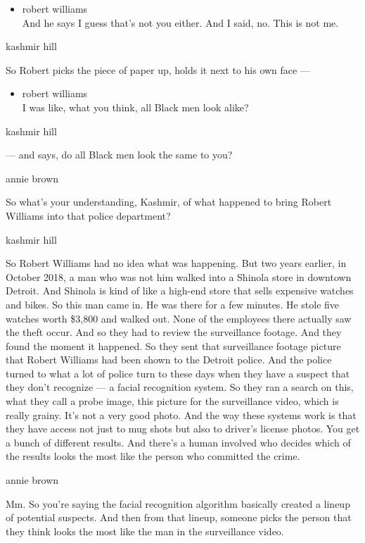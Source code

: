 \begin{itemize}
\tightlist
\item
  robert williams\\
  And he says I guess that's not you either. And I said, no. This is not
  me.
\end{itemize}

kashmir hill

So Robert picks the piece of paper up, holds it next to his own face ---

\begin{itemize}
\tightlist
\item
  robert williams\\
  I was like, what you think, all Black men look alike?
\end{itemize}

kashmir hill

--- and says, do all Black men look the same to you?

annie brown

So what's your understanding, Kashmir, of what happened to bring Robert
Williams into that police department?

kashmir hill

So Robert Williams had no idea what was happening. But two years
earlier, in October 2018, a man who was not him walked into a Shinola
store in downtown Detroit. And Shinola is kind of like a high-end store
that sells expensive watches and bikes. So this man came in. He was
there for a few minutes. He stole five watches worth \$3,800 and walked
out. None of the employees there actually saw the theft occur. And so
they had to review the surveillance footage. And they found the moment
it happened. So they sent that surveillance footage picture that Robert
Williams had been shown to the Detroit police. And the police turned to
what a lot of police turn to these days when they have a suspect that
they don't recognize --- a facial recognition system. So they ran a
search on this, what they call a probe image, this picture for the
surveillance video, which is really grainy. It's not a very good photo.
And the way these systems work is that they have access not just to mug
shots but also to driver's license photos. You get a bunch of different
results. And there's a human involved who decides which of the results
looks the most like the person who committed the crime.

annie brown

Mm. So you're saying the facial recognition algorithm basically created
a lineup of potential suspects. And then from that lineup, someone picks
the person that they think looks the most like the man in the
surveillance video.

